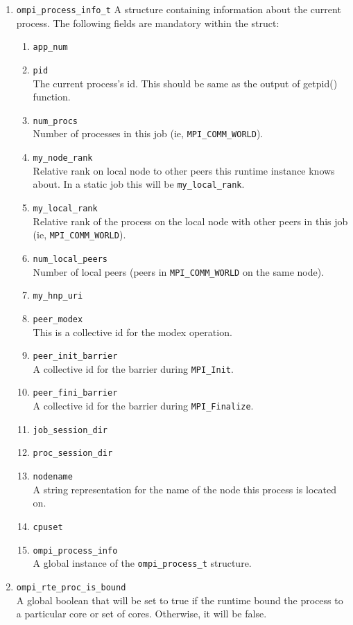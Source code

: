 \begin{enumerate}
\item \verb|ompi_process_info_t|
  A structure containing information about the current process. The following fields are mandatory within the struct:
  \begin{enumerate}
  \item \verb|app_num|
  \item \verb|pid|\\
    The current process's id. This should be same as the output of getpid() function.
  \item \verb|num_procs|\\
    Number of processes in this job (ie, \verb|MPI_COMM_WORLD|).
  \item \verb|my_node_rank|\\
    Relative rank on local node to other peers this runtime instance knows about. In a static job this will be \verb|my_local_rank|.
  \item \verb|my_local_rank|\\
    Relative rank of the process on the local node with other peers in this job (ie, \verb|MPI_COMM_WORLD|).
  \item \verb|num_local_peers|\\
    Number of local peers (peers in \verb|MPI_COMM_WORLD| on the same node).
  \item \verb|my_hnp_uri|
  \item \verb|peer_modex| \\
    This is a collective id for the modex operation.
  \item \verb|peer_init_barrier| \\
    A collective id for the barrier during \verb|MPI_Init|.
  \item \verb|peer_fini_barrier| \\
    A collective id for the barrier during \verb|MPI_Finalize|.
  \item \verb|job_session_dir|
  \item \verb|proc_session_dir|
  \item \verb|nodename| \\
    A string representation for the name of the node this process is located on.
  \item \verb|cpuset|
  \item \verb|ompi_process_info| \\
    A global instance of the \verb|ompi_process_t| structure.
  \end{enumerate}
  
\item \verb|ompi_rte_proc_is_bound|\\
  A global boolean that will be set to true if the runtime bound the process to a particular core or set of cores. Otherwise, it will be false.
\end{enumerate}


